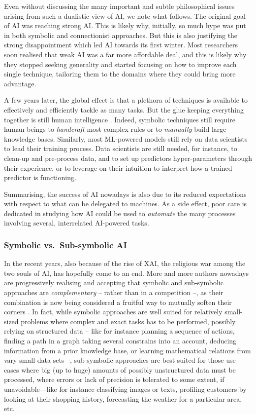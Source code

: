 \documentclass[12pt,a4paper,openright,twoside]{book}
\begin{document}
Even without discussing the many important and subtle philosophical issues arising from such a dualistic view of AI, we note what follows.
%
The original goal of AI was reaching strong AI.
%
This is likely why, initially, so much hype was put in both symbolic and connectionist approaches.
%
But this is also justifying the strong disappointment which led AI towards its first winter.
%
Most researchers soon realised that weak AI was a far more affordable deal, and this is likely why they stopped seeking generality and started focusing on how to improve each single technique, tailoring them to the domains where they could bring more advantage.

A few years later, the global effect is that a plethora of techniques is available to effectively and efficiently tackle as many tasks.
%
But the glue keeping everything together is still human intelligence \cite{Yao2018}.
%
Indeed, symbolic techniques still require human beings to \emph{handcraft} most complex rules or to \emph{manually} build large knowledge bases.
%
Similarly, most ML-powered models still rely on data scientists to lead their training process.
%
Data scientists are still needed, for instance, to clean-up and pre-process data, and to set up predictors hyper-parameters through their experience, or to leverage on their intuition to interpret how a trained predictor is functioning.

Summarising, the success of AI nowadays is also due to its reduced expectations with respect to what can be delegated to machines.
%
As a side effect, poor care is dedicated in studying how AI could be used to \emph{automate} the many processes involving several, interrelated AI-powered tasks.

\subsubsection{Symbolic vs.\ Sub-symbolic AI}

In the recent years, also because of the rise of XAI, the religious war among the two souls of AI, has hopefully come to an end.
%
More and more authors nowadays are progressively realising and accepting that symbolic and sub-symbolic approaches are \emph{complementary} -- rather than in a competition --, as their combination is now being considered a fruitful way to mutually soften their corners \cite{Hoehndorf2017, xailp-woa2019, lpaas-bdcc2}.
%
In fact, while symbolic approaches are well suited for relatively small-sized problems where complex and exact tasks has to be performed, possibly relying on structured data -- like for instance planning a sequence of actions, finding a path in a graph taking several constrains into an account, deducing information from a prior knowledge base, or learning mathematical relations from vary small data sets --, sub-symbolic approaches are best suited for those use cases where big (up to huge) amounts of possibly unstructured data  must be processed, where errors or lack of precision is tolerated to some extent, if unavoidable---like for instance classifying images or texts, profiling customers by looking at their shopping history, forecasting the weather for a particular area, etc.
\end{document}
